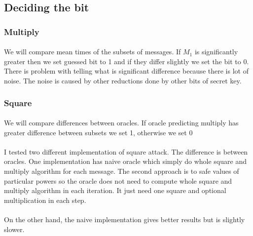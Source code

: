 \documentclass[thesis=B,english]{FITthesis}[2012/10/20]
\begin{document}
{{\subsection{Deciding the bit}

\subsubsection{Multiply}
\paragraph*{}{
We will compare mean times of the subsets of messages. If \(M_1\) is significantly greater then we set guessed bit to 1 and if they differ slightly we set the bit to 0. There is problem with telling what is significant difference because there is lot of noise. The noise is caused by other reductions done by other bits of secret key.

}

\subsubsection{Square}
\paragraph*{}{
We will compare differences between oracles. If oracle predicting multiply has greater difference between subsets we set 1, otherwise we set 0
}

\paragraph*{}
{I tested two different implementation of square attack. The difference is between oracles. One implementation has naive oracle which simply do whole square and multiply algorithm 
for each message. The second approach is to safe values of particular powers so the oracle does not need to compute whole square and multiply algorithm in each iteration. It just need
one square and optional multiplication in each step.
}

\paragraph*{}{
On the other hand, the naive implementation gives better results but is slightly slower.
}

}}
\end{document}
